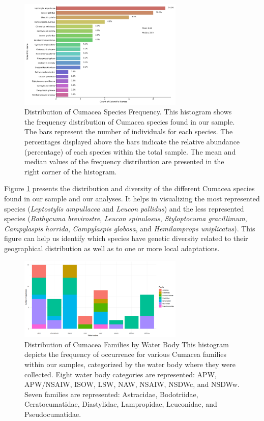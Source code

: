 \begin{figure}[]
    \centering
    \includegraphics[width=0.7\textwidth]{figure2.jpg}
    \caption{Distribution of Cumacea Species Frequency. This histogram shows the frequency distribution of Cumacea species found in our sample. The bars represent the number of individuals for each species. The percentages displayed above the bars indicate the relative abundance (percentage) of each species within the total sample. The mean and median values of the frequency distribution are presented in the right corner of the histogram. \label{fig:fig2}}
\end{figure}

Figure \ref{fig:fig2} presents the distribution and diversity of the different Cumacea species found in our sample and our analyses. It helps in visualizing the most represented species (\emph{Leptostylis ampullacea} and \emph{Leucon pallidus}) and the less represented species (\emph{Bathycuma brevirostre}, \emph{Leucon spinulosus}, \emph{Styloptocuma gracillimum}, \emph{Campylaspis horrida}, \emph{Campylaspis globosa}, and \emph{Hemilamprops uniplicatus}). This figure can help us identify which species have genetic diversity related to their geographical distribution as well as to one or more local adaptations.

\begin{figure}[]
    \centering
    \includegraphics[width=0.7\textwidth]{figure3.png}
    \caption{Distribution of Cumacea Families by Water Body This histogram depicts the frequency of occurrence for various Cumacea families within our samples, categorized by the water body where they were collected. Eight water body categories are represented: APW, APW/NSAIW, ISOW, LSW, NAW, NSAIW, NSDWc, and NSDWw. Seven families are represented: Astracidae, Bodotriidae, Ceratocumatidae, Diastylidae, Lampropidae, Leuconidae, and Pseudocumatidae. \label{fig:fig3}}
\end{figure}

